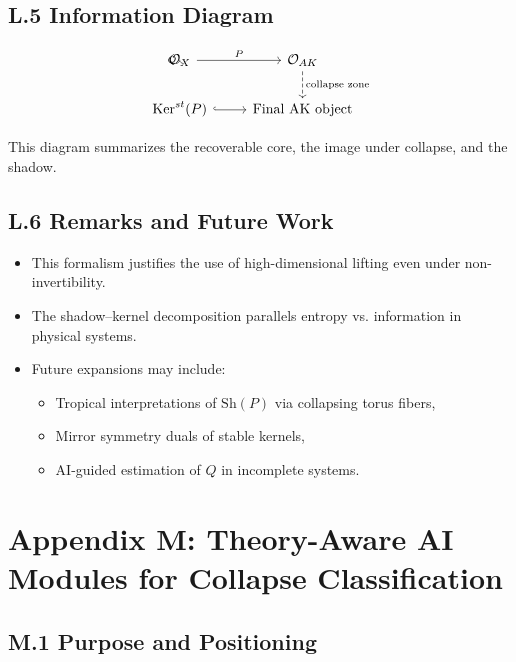 \documentclass[11pt]{article}
\begin{document}
\subsection*{L.5 Information Diagram}

\[
\begin{tikzcd}
\mathcal{O}_X \arrow[r, "P"] \arrow[dashed, bend right, swap, "Q"'] &
\mathcal{O}_{AK} \arrow[d, dashed, "\text{collapse zone}"] \\
\mathrm{Ker}^{st}(P) \arrow[r, hook] &
\text{Final AK object}
\end{tikzcd}
\]

This diagram summarizes the recoverable core, the image under collapse, and the shadow.

\subsection*{L.6 Remarks and Future Work}

\begin{itemize}
  \item This formalism justifies the use of high-dimensional lifting even under non-invertibility.
  \item The shadow–kernel decomposition parallels entropy vs. information in physical systems.
  \item Future expansions may include:
    \begin{itemize}
      \item Tropical interpretations of $\mathrm{Sh}(P)$ via collapsing torus fibers,
      \item Mirror symmetry duals of stable kernels,
      \item AI-guided estimation of $Q$ in incomplete systems.
    \end{itemize}
\end{itemize}



\section*{Appendix M: Theory-Aware AI Modules for Collapse Classification}

\subsection*{M.1 Purpose and Positioning}
\end{document}
